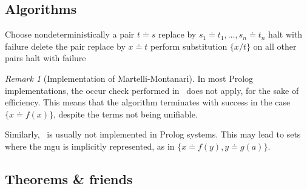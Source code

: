 \documentclass{report}
\theoremstyle{definition}
\theoremstyle{plain}
\theoremstyle{remark}
\newtheorem{rem}{Remark}
\begin{document}
\subsection{Algorithms}

\begin{algorithm}
    \caption{Martelli-Montanari: computing \gls{mgu} for a unification problem \label{alg:mm}}
    \begin{algorithmic}[1]
      \Statex
      \Repeat
      \State Choose nondeterministically a pair \(t \doteq s\)
      \State replace by \(s_1 \doteq t_1,\dotsc,s_n \doteq t_n\) \label{mm:1}
      \EndCase
      \State halt with failure  \label{mm:2}
      \EndCase
      \State delete the pair \label{mm:3}
      \EndCase
      \State replace by \(x \doteq t\) \label{mm:4}
      \EndCase
      \State perform substitution \(\lbrace x/t \rbrace\) on all other pairs \label{mm:5}
      \EndCase
      \State halt with failure  \label{mm:6}
      \EndCase
      \EndSwitch
      \State {}
    \end{algorithmic}
  \end{algorithm}

  \begin{rem}[Implementation of Martelli-Montanari]
      In most Prolog implementations, the occur check performed in~ does not apply, for the sake of efficiency.
      This means that the algorithm terminates with success in the case \(\lbrace x \doteq f(x) \rbrace\), despite the terms not being unifiable.

      Similarly,~ is usually not implemented in Prolog systems.
      This may lead to sets where the \gls{mgu} is implicitly represented, as in \(\lbrace x \doteq f(y), y \doteq g(a) \rbrace\).
  \end{rem}

\subsection{Theorems \& friends}
\end{document}
